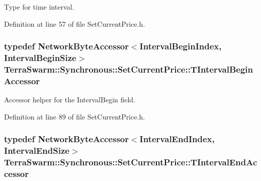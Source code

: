 Type for time interval. 



Definition at line 57 of file Set\-Current\-Price.\-h.

\hypertarget{class_terra_swarm_1_1_synchronous_1_1_set_current_price_a2d095e9cd5341bca06b121f115875bcc}{
\subsubsection[{T\-Interval\-Begin\-Accessor}]{\setlength{\rightskip}{0pt plus 5cm}typedef {\bf Network\-Byte\-Accessor}$<${\bf Interval\-Begin\-Index}, {\bf Interval\-Begin\-Size}$>$ {\bf Terra\-Swarm\-::\-Synchronous\-::\-Set\-Current\-Price\-::\-T\-Interval\-Begin\-Accessor}\hspace{0.3cm}{\ttfamily [private]}}}\label{class_terra_swarm_1_1_synchronous_1_1_set_current_price_a2d095e9cd5341bca06b121f115875bcc}


Accessor helper for the Interval\-Begin field. 



Definition at line 89 of file Set\-Current\-Price.\-h.

\hypertarget{class_terra_swarm_1_1_synchronous_1_1_set_current_price_ada50db521ec8f4351b11c9e7a55191f6}{
\subsubsection[{T\-Interval\-End\-Accessor}]{\setlength{\rightskip}{0pt plus 5cm}typedef {\bf Network\-Byte\-Accessor}$<${\bf Interval\-End\-Index}, {\bf Interval\-End\-Size}$>$ {\bf Terra\-Swarm\-::\-Synchronous\-::\-Set\-Current\-Price\-::\-T\-Interval\-End\-Accessor}\hspace{0.3cm}{\ttfamily [private]}}}\label{class_terra_swarm_1_1_synchronous_1_1_set_current_price_ada50db521ec8f4351b11c9e7a55191f6}


